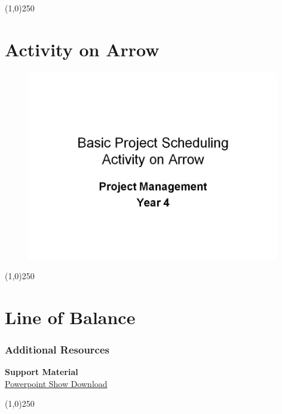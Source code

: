 \begin{center}\line(1,0){250}\end{center}



\section{Activity on Arrow}



\begin{frame}
\begin{figure}
	\centering
		\includegraphics[width = 11cm]{oldnotes/Slide60.jpg}
	\label{fig:slide60}
\end{figure}
\end{frame}
\begin{center}\line(1,0){250}\end{center}

















\section{Line of Balance}


\begin{frame}
\frametitle{Additional Resources}
\textbf{Support Material}\\
\href{https://sites.google.com/site/paulveseyresourcefiles/project-management/Lecture_12_-_PTM_LOB_5-8_PPShow.ppsx?attredirects=0&d=1}{Powerpoint Show Download}\\
\end{frame}
\begin{center}\line(1,0){250}\end{center}




